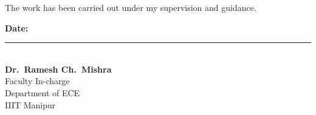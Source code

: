 \vspace{0.4cm}
\noindent
The work has been carried out under my supervision and guidance.

\vspace{2.5cm}
\noindent
\begin{minipage}{0.45\textwidth}
\textbf{Date:} \underline{\hspace{3.5cm}}
\end{minipage}
\hfill
\begin{minipage}{0.5\textwidth}
\begin{flushright}
\rule{6cm}{0.4pt}\\[0.05cm]
\textbf{Dr.\ Ramesh Ch.\ Mishra}\\
Faculty In-charge\\
Department of ECE\\
IIIT Manipur
\end{flushright}
\end{minipage}

\newpage
